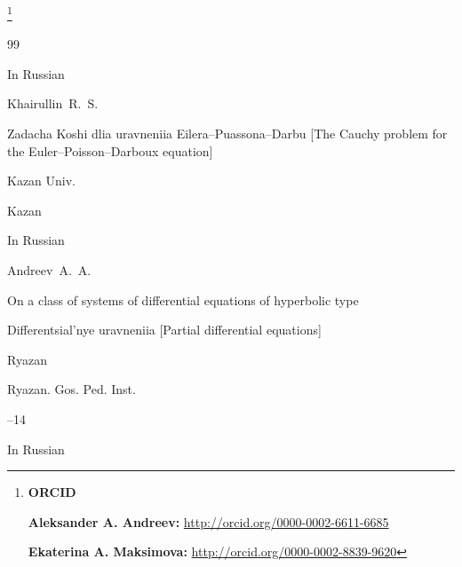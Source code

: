 \thanks{{\bf ORCID}





{\bf Aleksander A. Andreev:} \url{http://orcid.org/0000-0002-6611-6685}



{\bf Ekaterina A. Maksimova:} \url{http://orcid.org/0000-0002-8839-9620}







}





\EngRef







\begin{thebibliography}{99}






\lang In Russian

\by  Khairullin~R.~S.

\book Zadacha Koshi dlia uravneniia Eilera--Puassona--Darbu \rm [The Cauchy problem for the Euler--Poisson--Darboux equation]

\publ Kazan Univ.

\publaddr Kazan








\lang In Russian

\by Andreev~A.~A.

\paper On a class of systems of differential equations of hyperbolic type

\inbook Differentsial'nye uravneniia \rm [Partial differential equations]

\publaddr Ryazan

\publ Ryazan. Gos. Ped. Inst.



--14








\lang In Russian


\end{thebibliography}
